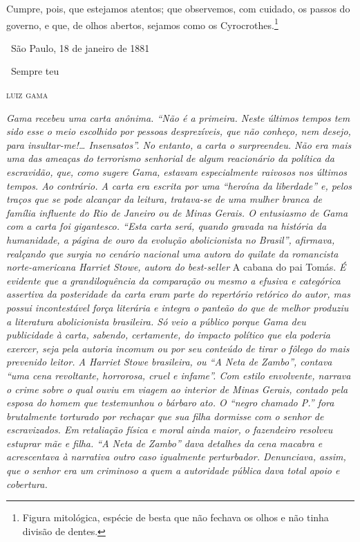 {Cumpre, pois, que estejamos atentos; que observemos, com cuidado, os
passos do governo, e que, de olhos abertos, sejamos como os
Cyrocrothes.\footnote{Figura mitológica, espécie de besta que não 
  fechava os olhos e não tinha divisão de dentes.}\medskip

\hfill\ São Paulo, 18 de janeiro de 1881

\hfill\ Sempre teu

\hfill\textsc{luiz gama}


\begin{resumo}
\emph{Gama recebeu uma carta anônima. ``Não é a primeira. Neste últimos
tempos tem sido esse o meio escolhido por pessoas desprezíveis, que não
conheço, nem desejo, para insultar-me!\ldots{} Insensatos''. No entanto, a
carta o surpreendeu. Não era mais uma das ameaças do terrorismo
senhorial de algum reacionário da política da escravidão, que, como
sugere Gama, estavam especialmente raivosos nos últimos tempos. Ao
contrário. A carta era escrita por uma ``heroína da liberdade'' e, pelos
traços que se pode alcançar da leitura, tratava-se de uma mulher branca
de família influente do Rio de Janeiro ou de Minas Gerais. O entusiasmo
de Gama com a carta foi gigantesco. ``Esta carta será, quando gravada na
história da humanidade, a página de ouro da evolução abolicionista no
Brasil'', afirmava, realçando que surgia no cenário nacional uma autora
do quilate da romancista norte-americana Harriet Stowe, autora do
best-seller} A cabana do pai Tomás. \emph{É evidente que a
grandiloquência da comparação ou mesmo a efusiva e categórica assertiva
da posteridade da carta eram parte do repertório retórico do autor, mas
possui incontestável força
literária e integra o panteão do que de melhor produziu a literatura
abolicionista brasileira. Só veio a público porque Gama deu publicidade à
carta, sabendo, certamente, do impacto político que ela poderia exercer,
seja pela autoria incomum ou por seu conteúdo de tirar o fôlego do mais
prevenido leitor. A Harriet Stowe brasileira, ou ``A Neta de Zambo'',
contava ``uma cena revoltante, horrorosa, cruel e infame''. Com estilo
envolvente, narrava o crime sobre o qual ouviu em viagem ao interior de Minas Gerais, contado pela esposa do homem que
testemunhou o bárbaro ato. O ``negro chamado P.''
fora brutalmente torturado por rechaçar que sua filha dormisse com o
senhor de escravizados. Em retaliação física e moral ainda maior, o
fazendeiro resolveu estuprar mãe e filha. ``A Neta de Zambo'' dava
detalhes da cena macabra e acrescentava à narrativa outro caso
igualmente perturbador. Denunciava, assim, que o senhor era um
criminoso a quem a autoridade pública dava total apoio e cobertura.}
\end{resumo}\pagebreak

}
